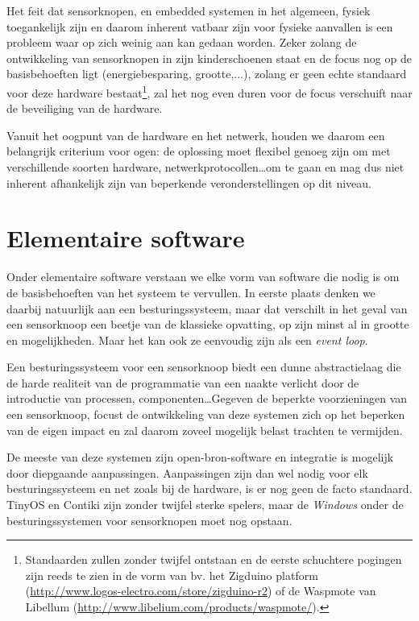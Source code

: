 Het feit dat sensorknopen, en embedded systemen in het algemeen, fysiek
toegankelijk zijn en daarom inherent vatbaar zijn voor fysieke aanvallen is een
probleem waar op zich weinig aan kan gedaan worden. Zeker zolang de
ontwikkeling van sensorknopen in zijn kinderschoenen staat en de focus nog op
de basisbehoeften ligt (energiebesparing, grootte,...), zolang er geen echte
standaard voor deze hardware bestaat\footnote{Standaarden zullen zonder twijfel
ontstaan en de eerste schuchtere pogingen zijn reeds te zien in de vorm van bv.
het Zigduino platform (\url{http://www.logos-electro.com/store/zigduino-r2}) of
de Waspmote van Libellum (\url{http://www.libelium.com/products/waspmote/}).},
zal het nog even duren voor de focus verschuift naar de beveiliging van de
hardware.

Vanuit het oogpunt van de hardware en het netwerk, houden we daarom een
belangrijk criterium voor ogen: de oplossing moet flexibel genoeg zijn om met
verschillende soorten hardware, netwerkprotocollen\dots om te gaan en mag dus
niet inherent afhankelijk zijn van beperkende veronderstellingen op dit niveau.

\vspace{-3mm}

\section{Elementaire software}
\label{section:solution-software}

Onder elementaire software verstaan we elke vorm van software die nodig is om
de basisbehoeften van het systeem te vervullen. In eerste plaats denken we
daarbij natuurlijk aan een besturingssysteem, maar dat verschilt in het geval
van een sensorknoop een beetje van de klassieke opvatting, op zijn minst al in
grootte en mogelijkheden. Maar het kan ook ze eenvoudig zijn als een
\emph{event loop}.

Een besturingssysteem voor een sensorknoop biedt een dunne abstractielaag die
de harde realiteit van de programmatie van een naakte \mcu verlicht door de
introductie van processen, componenten\dots Gegeven de beperkte voorzieningen
van een sensorknoop, focust de ontwikkeling van deze systemen zich op het
beperken van de eigen impact en zal daarom zoveel mogelijk belast trachten te
vermijden.

De meeste van deze systemen zijn open-bron-software en integratie is mogelijk
door diepgaande aanpassingen. Aanpassingen zijn dan wel nodig voor elk
besturingssysteem en net zoals bij de hardware, is er nog geen de facto
standaard. TinyOS en Contiki zijn zonder twijfel sterke spelers, maar de
\emph{Windows} onder de besturingssystemen voor sensorknopen moet nog opstaan.

